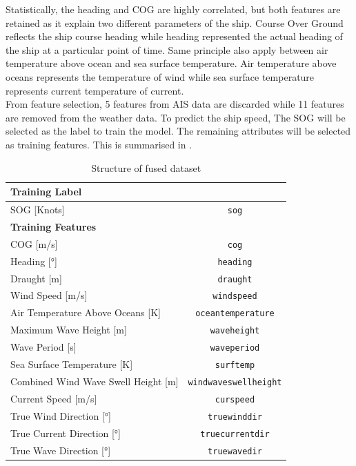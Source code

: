Statistically, the heading and COG are highly correlated, but both features are retained as it explain two different parameters of the ship. Course Over Ground reflects the ship course heading while heading represented the actual heading of the ship at a particular point of time. Same principle also apply between air temperature above ocean and sea surface temperature. Air temperature above oceans represents the temperature of wind while sea surface temperature represents current temperature of current.\\

From feature selection, 5 features from AIS data are discarded while 11 features are removed from the weather data. To predict the ship speed, The SOG will be selected as the label to train the model. The remaining attributes will be selected as training features. This is summarised in .
\begin{table}
    \centering
    {\begin{tabular}{ |p{8cm}|c| }
    \hline
    \multicolumn{2}{|l|}{\textbf{Training Label}}\\
    \hline
    SOG [Knots] & {\tt sog} \\
    \hline
    \multicolumn{2}{|l|}{\textbf{Training Features}}\\
    \hline
    COG [m/s] & {\tt cog}  \\
    \hline
    Heading [°] & {\tt heading}  \\
    \hline
    Draught [m] & {\tt draught} \\
    \hline
    Wind Speed [m/s] & {\tt windspeed} \\
    \hline
    Air Temperature Above Oceans [K] & {\tt oceantemperature} \\
    \hline
    Maximum Wave Height [m] & {\tt waveheight} \\
    \hline
    Wave Period [s] & {\tt waveperiod}\\
    \hline
    Sea Surface Temperature [K] & {\tt surftemp}\\
    \hline
    Combined Wind Wave Swell Height [m] &  {\tt windwaveswellheight} \\
    \hline
    Current Speed [m/s] & {\tt curspeed} \\
    \hline
    True Wind Direction [°] & {\tt truewinddir}  \\
    \hline
    True Current Direction [°] & {\tt truecurrentdir} \\
    \hline
    True Wave Direction [°] & {\tt truewavedir} \\
    \hline
    \end{tabular}}
\caption{Structure of fused dataset}\label{tbl:dataset_train_struct}
\end{table}

